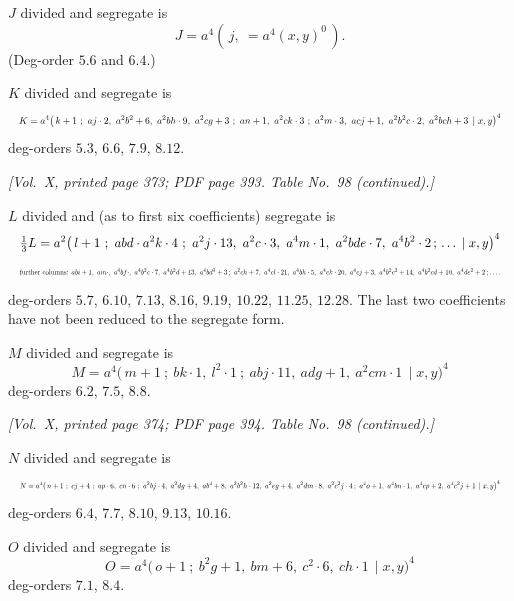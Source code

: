 \documentclass[11pt]{article}
\begin{document}
\medskip

\noindent$J$ divided and segregate is
\[
J=a^{4}(\,j,\ =a^{4}(x,y)^{0}\,).
\]
(Deg-order $5.6$ and $6.4$.)

\medskip

\noindent$K$ divided and segregate is
\[
\resizebox{\textwidth}{!}{$\displaystyle
K=a^{4}\bigl(\,k+1\ ;\ aj\cdot 2,\ a^{2}b^{2}+6,\ a^{2}bh\cdot 9,\ a^{2}cg+3\ ;\ an+1,\ a^{2}ck\cdot 3\ ;\ a^{2}m\cdot 3,\ acj+1,\ a^{2}b^{2}c\cdot 2,\ a^{2}bch+3\,\mid x,y\bigr)^{4}
$}
\]
deg-orders $5.3$, $6.6$, $7.9$, $8.12$.

\newpage

\noindent\textit{[Vol.~X, printed page 373; PDF page 393. Table No.~98 (continued).]}

\medskip

\noindent$L$ divided and (as to first six coefficients) segregate is
\[
\resizebox{\textwidth}{!}{$\displaystyle
\tfrac{1}{3}L=a^{2}\bigl(\,l+1\ ;\ abd\cdot a^{2}k\cdot 4\ ;\ a^{2}j\cdot 13,\ a^{2}c\cdot 3,\ a^{4}m\cdot 1,\ a^{2}bde\cdot 7,\ a^{4}b^{2}\cdot 2\,;\,\ldots\,\mid x,y\bigr)^{4}
$}
\]
\[
\resizebox{\textwidth}{!}{$\displaystyle
\text{further columns: }abi+1,\ am\cdot,\ a^{4}bf\cdot,\ a^{4}b^{2}c\cdot 7,\ a^{4}b^{2}d+13,\ a^{4}bd^{3}+3\,;\ a^{2}ch+7,\ a^{4}cl\cdot 21,\ a^{4}bh\cdot 5,\ a^{4}ck\cdot 20,\ a^{4}cj+3,\ a^{4}b^{2}c^{2}+14,\ a^{4}b^{2}cd+10,\ a^{4}de^{2}+2\,;\ldots.
$}
\]
deg-orders $5.7$, $6.10$, $7.13$, $8.16$, $9.19$, $10.22$, $11.25$, $12.28$. The last two coefficients have not been reduced to the segregate form.

\medskip

\noindent$M$ divided and segregate is
\[
M=a^{4}\bigl(\,m+1\ ;\ bk\cdot 1,\ l^{2}\cdot 1\ ;\ abj\cdot 11,\ adg+1,\ a^{2}cm\cdot 1\,\mid x,y\bigr)^{4}
\]
deg-orders $6.2$, $7.5$, $8.8$.

\newpage

\noindent\textit{[Vol.~X, printed page 374; PDF page 394. Table No.~98 (continued).]}

\medskip

\noindent$N$ divided and segregate is
\[
\resizebox{\textwidth}{!}{$\displaystyle
N=a^{4}\bigl(\,n+1\ ;\ cj+4\ ;\ ap\cdot 6,\ cn\cdot 6\ ;\ a^{2}bj\cdot 4,\ a^{2}dg+4,\ ab^{4}+8,\ a^{2}b^{2}h\cdot 12,\ a^{2}eg+4,\ a^{2}dm\cdot 8,\ a^{2}c^{2}j\cdot 4\,;\ a^{4}o+1,\ a^{4}bn\cdot 1,\ a^{4}cp+2,\ a^{4}c^{2}j+1\,\mid x,y\bigr)^{4}
$}
\]
deg-orders $6.4$, $7.7$, $8.10$, $9.13$, $10.16$.

\medskip

\noindent$O$ divided and segregate is
\[
O=a^{4}\bigl(\,o+1\ ;\ b^{2}g+1,\ bm+6,\ c^{2}\cdot 6,\ ch\cdot 1\,\mid x,y\bigr)^{4}
\]
deg-orders $7.1$, $8.4$.
\end{document}
